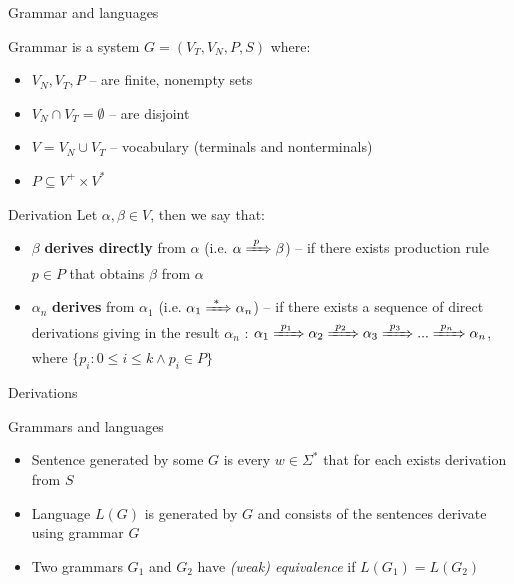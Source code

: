 \documentclass{beamer}
\begin{document}
\begin{frame}{Grammar and languages}

	\begin{definition}{Grammar}
		is a system $G = (V_T, V_N, P, S)$ where:
		\begin{itemize}
			\item $V_N, V_T, P$ -- are finite, nonempty sets
			\item $V_N \cap V_T = \emptyset$ -- are disjoint
			\item $V = V_N \cup V_T$ -- vocabulary (terminals and nonterminals)
			\item $P \subseteq V^{+} \times V^{\ast}$
		\end{itemize}
	\end{definition}
	
	\begin{block}{Derivation}
		Let $\alpha, \beta \in V$, then we say that:
		\begin{itemize}
			\item $\beta$ \textbf{derives directly} from $\alpha$ (i.e. $\alpha \xRightarrow{\ p\ } \beta$) -- if there exists production rule $p\in P$ that obtains $\beta$ from $\alpha$
			\item $\alpha_n$ \textbf{derives} from $\alpha_1$ (i.e. $\alpha_1 \xRightarrow{\ *\ }\alpha_n$) -- if there exists a sequence of direct derivations giving in the result $\alpha_n$ : $\alpha_1\xRightarrow{\ p_1\ }\alpha_2\xRightarrow{\ p_2\ }\alpha_3\xRightarrow{\ p_3\ }...\xRightarrow{\ p_n\ }\alpha_n$, where $\{p_i : 0\leq i\leq k \land p_i\in P\}$  
		\end{itemize}
	\end{block}

 \end{frame}
 
 \begin{frame}{Derivations}
 	
 	\begin{block}{Grammars and languages}
 		\begin{itemize}
 			\item Sentence generated by some $G$ is every $w\in \Sigma^{\ast}$ that for each exists derivation from $S$
 			\item Language $L(G)$ is generated by $G$ and consists of the sentences derivate using grammar $G$
 			\item Two grammars $G_1$ and $G_2$ have \textit{(weak) equivalence} if $L(G_1) = L(G_2)$
 		\end{itemize}
 	\end{block}
 	
 \end{frame}
\end{document}
